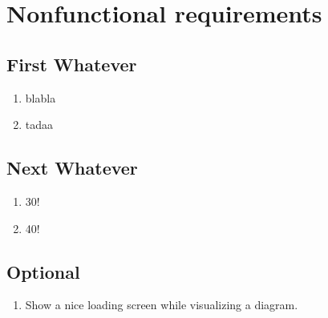 \section{Nonfunctional requirements}

\renewcommand{\theenumi}{/NF\arabic{enumi}0/}
\renewcommand{\labelenumi}{\theenumi}


\subsection{First Whatever}

\begin{enumerate}
  \item blabla %
  \item tadaa %
\end{enumerate}

\subsection{Next Whatever}

\begin{enumerate}[resume] %
  \item 30!
  \item 40!
\end{enumerate}

\subsection{Optional}

\begin{enumerate}
  \item Show a nice loading screen while visualizing a diagram. %
\end{enumerate}